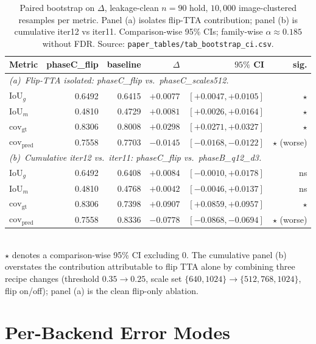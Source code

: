 \documentclass{article}
\begin{document}
\begin{table}[h]
\centering
\caption{Paired bootstrap on $\Delta$, leakage-clean $n{=}90$ hold,
$10{,}000$ image-clustered resamples per metric. Panel (a)
isolates flip-TTA contribution; panel (b) is cumulative iter12 vs
iter11. Comparison-wise 95\% CIs; family-wise $\alpha \approx 0.185$
without FDR. Source: \texttt{paper\_tables/tab\_bootstrap\_ci.csv}.}
\label{tab:bootstrap-ci}
\small
\begin{tabular}{lrrrrr}
\toprule
Metric & phaseC\_flip & baseline & $\Delta$ &
$95\%$ CI & sig. \\
\midrule
\multicolumn{6}{l}{\emph{(a)~Flip-TTA isolated: phaseC\_flip vs.\ phaseC\_scales512.}} \\
IoU$_g$                       & 0.6492 & 0.6415 & $+0.0077$ & $[+0.0047, +0.0105]$ & $\star$ \\
IoU$_m$                       & 0.4810 & 0.4729 & $+0.0081$ & $[+0.0026, +0.0164]$ & $\star$ \\
$\mathrm{cov}_{\mathrm{gt}}$  & 0.8306 & 0.8008 & $+0.0298$ & $[+0.0271, +0.0327]$ & $\star$ \\
$\mathrm{cov}_{\mathrm{pred}}$ & 0.7558 & 0.7703 & $-0.0145$ & $[-0.0168, -0.0122]$ & $\star$ (worse) \\
\midrule
\multicolumn{6}{l}{\emph{(b)~Cumulative iter12 vs.\ iter11: phaseC\_flip vs.\ phaseB\_q12\_d3.}} \\
IoU$_g$                       & 0.6492 & 0.6408 & $+0.0084$ & $[-0.0010, +0.0178]$ & ns      \\
IoU$_m$                       & 0.4810 & 0.4768 & $+0.0042$ & $[-0.0046, +0.0137]$ & ns      \\
$\mathrm{cov}_{\mathrm{gt}}$  & 0.8306 & 0.7398 & $+0.0907$ & $[+0.0859, +0.0957]$ & $\star$ \\
$\mathrm{cov}_{\mathrm{pred}}$ & 0.7558 & 0.8336 & $-0.0778$ & $[-0.0868, -0.0694]$ & $\star$ (worse) \\
\bottomrule
\end{tabular}\\
\footnotesize{$\star$ denotes a comparison-wise 95\% CI excluding 0.
The cumulative panel (b) overstates the contribution attributable to
flip TTA alone by combining three recipe changes (threshold $0.35\to
0.25$, scale set $\{640,1024\}\to\{512,768,1024\}$, flip on/off);
panel (a) is the clean flip-only ablation.}
\end{table}

\section{Per-Backend Error Modes}
\label{app:errors}
\setcounter{table}{0}\setcounter{figure}{0}
\end{document}
